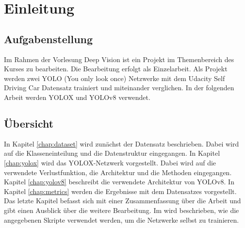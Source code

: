 \chapter{Einleitung}

\section{Aufgabenstellung}
Im Rahmen der Vorlesung Deep Vision ist ein Projekt im Themenbereich des Kurses zu bearbeiten. Die Bearbeitung erfolgt als Einzelarbeit. Als Projekt werden zwei YOLO (You only look once) Netzwerke mit dem Udacity Self Driving Car Datensatz trainiert und miteinander verglichen. In der folgenden Arbeit werden YOLOX und YOLOv8 verwendet.


\section{Übersicht}
In Kapitel \ref{chap:dataset} wird zunächst der Datensatz beschrieben. Dabei wird auf die Klasseneinteilung und die Datenstruktur eingegangen. In Kapitel \ref{chap:yolox} wird das YOLOX-Netzwerk vorgestellt. Dabei wird auf die verwendete Verlustfunktion, die Architektur und die Methoden eingegangen. Kapitel \ref{chap:yolov8} beschreibt die verwendete Architektur von YOLOv8. In Kapitel \ref{chap:metrics} werden die Ergebnisse mit dem Datensatzes vorgestellt. Das letzte Kapitel befasst sich mit einer Zusammenfassung über die Arbeit und gibt einen Ausblick über die weitere Bearbeitung. Im  wird beschrieben, wie die angegebenen Skripte verwendet werden, um die Netzwerke selbst zu trainieren.


